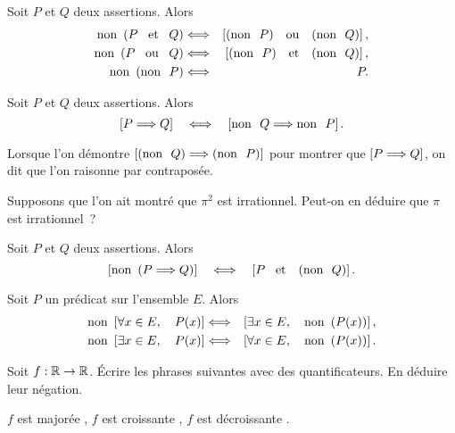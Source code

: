 \documentclass{magnoliaold}
\begin{document}
\begin{proposition}[utile=-3, nom={Lois de \nom{Morgan}}]
Soit $P$ et $Q$ deux assertions. Alors
\begin{eqnarray*}
\non\p{P \et Q} &\ssi& \cro{\p{\non\  P} \ou \p{\non\  Q}},\\
\non\p{P \ou Q} &\ssi& \cro{\p{\non\  P} \et \p{\non\  Q}},\\
\non\p{\non\  P} &\ssi& P.
\end{eqnarray*}
\end{proposition}

\begin{proposition}[utile=-3, nom={Raisonnement par contraposée}]
Soit $P$ et $Q$ deux assertions. Alors
\[\left[P \Longrightarrow Q\right] \quad\Longleftrightarrow\quad \left[{\rm non}\ \  Q \Longrightarrow {\rm non}\ \  P\right].\]
\end{proposition}

\begin{remarqueUnique}
\remarque Lorsque l'on démontre $\left[\left({\rm non}\ \  Q\right) \Longrightarrow \left({\rm non}\ \  P\right)\right]$ pour montrer
  que $\left[P\Longrightarrow Q\right]$, on dit que l'on raisonne par contraposée.
\end{remarqueUnique}

\begin{exoUnique}
\exo Supposons que l'on ait montré que $\pi^2$ est irrationnel. Peut-on en
  déduire que $\pi$ est irrationnel~?
\end{exoUnique}

\begin{proposition}[utile=-3]
Soit $P$ et $Q$ deux assertions. Alors
\[\left[{\rm non}\ \left(P \Longrightarrow Q\right)\right] \quad\Longleftrightarrow\quad \left[P \quad\!\text{et}\quad\! \left({\rm non}\ \ Q\right)\right].\]  
\end{proposition}


\begin{proposition}[utile=-3]
Soit $P$ un prédicat sur l'ensemble $E$. Alors
\begin{eqnarray*}
{\rm non}\ \left[\forall x\in E ,\quad P(x)\right] &\Longleftrightarrow&
\left[\exists x\in E ,\quad {\rm non}\ \left(P(x)\right)\right],\\
{\rm non}\ \left[\exists x\in E ,\quad P(x)\right] &\Longleftrightarrow&
\left[\forall x\in E ,\quad {\rm non}\ \left(P(x)\right)\right].
\end{eqnarray*}
\end{proposition}

\begin{exoUnique}
\exo Soit $f:\mathbb{R}\to\mathbb{R}$. Écrire les phrases suivantes avec des
  quantificateurs. En déduire leur négation. \begin{center}
  \og $f$ est majorée \fg,
  \og $f$ est croissante \fg, \og $f$ est décroissante \fg. \end{center}
\end{exoUnique}
\end{document}
